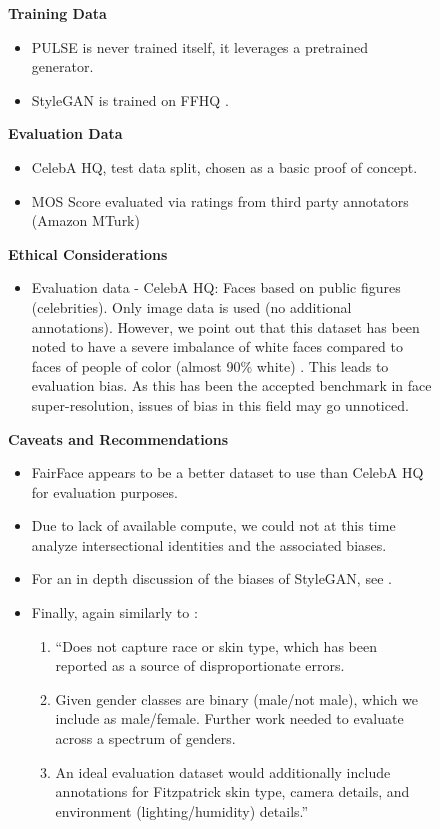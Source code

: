 \documentclass[10pt,twocolumn,letterpaper]{article}
\begin{document}
\begin{figure*}[ht]
\begin{tcolorbox}[
    sharp corners,
    colback=white,
    colframe=black
    ]
\begin{itemize}
\end{itemize}
\vspace{-12pt}
\begin{multicols}{2}
\textbf{Training Data}
\begin{itemize}
    \item PULSE is never trained itself, it leverages a pretrained generator.
    \item StyleGAN is trained on FFHQ \cite{karras2019style}. 
\end{itemize}
\columnbreak
\textbf{Evaluation Data}
\begin{itemize}
    \item CelebA HQ, test data split, chosen as a basic proof of concept. 
    \item MOS Score evaluated via ratings from third party annotators (Amazon MTurk)
\end{itemize}
\end{multicols}
\vspace{-12pt}
\textbf{Ethical Considerations}
\begin{itemize}
    \item Evaluation data - CelebA HQ: Faces based on public figures (celebrities). Only image data is used (no additional annotations). However, we point out that this dataset has been noted to have a severe imbalance of white faces compared to faces of people of color (almost 90\% white) \cite{fairface}. This leads to evaluation bias. As this has been the accepted benchmark in face super-resolution, issues of bias in this field may go unnoticed.
\end{itemize}
\textbf{Caveats and Recommendations}
\begin{itemize}
    \item FairFace appears to be a better dataset to use than CelebA HQ for evaluation purposes.
    \item Due to lack of available compute, we could not at this time analyze intersectional identities and the associated biases.
    \item For an in depth discussion of the biases of StyleGAN, see \cite{Salminen_Jung_Chowdhury_Jansen_2020b}.
    \item Finally, again similarly to \cite{modelcards}:
    \begin{enumerate}
    \item “Does not capture race or skin type, which has been reported as a source of disproportionate errors.
    \item Given gender classes are binary (male/not male), which we include as male/female. Further work needed to evaluate across a
    spectrum of genders.
    \item An ideal evaluation dataset would additionally include annotations for Fitzpatrick skin type, camera details, and environment (lighting/humidity) details.”
\end{enumerate}
\end{itemize}
\end{tcolorbox}
\end{figure*}
\end{document}
